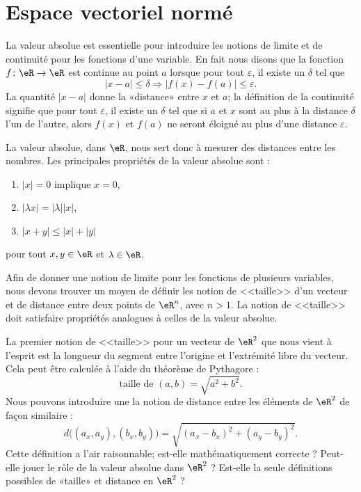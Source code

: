 
\section{Espace vectoriel normé}

La valeur absolue est essentielle pour introduire les notions de limite et de continuité pour les fonctions d'une variable. En fait nous disons que la fonction $f\colon \eR\to \eR$ est continue au point $a$ lorsque pour tout $\varepsilon$, il existe un $\delta$ tel que
\begin{equation}
	| x-a |\leq\delta \Rightarrow | f(x)-f(a) |\leq \varepsilon.
\end{equation}
La quantité $| x-a |$ donne la «distance» entre $x$ et $a$; la définition de la continuité signifie que pour tout $\varepsilon$, il existe un $\delta$ tel que si $a$ et $x$ sont au plus à la distance $\delta$ l'un de l'autre, alors $f(x)$ et $f(a)$ ne seront éloigné au plus d'une distance $\varepsilon$.

La valeur absolue, dans $\eR$, nous sert donc à mesurer des distances entre les nombres. Les principales propriétés de la valeur absolue sont :
\begin{enumerate}

	\item
		$| x |=0$ implique $x=0$,
	\item
		$| \lambda x |=| \lambda | |x |$,
	\item
		$| x+y |\leq | x |+| y |$

\end{enumerate}
pour tout $x,y\in\eR$ et $\lambda\in\eR$.

Afin de donner une notion de limite pour les fonctions de plusieurs variables, nous devons trouver un moyen de définir les notion de <<taille>> d'un vecteur et de distance entre deux points de $\eR^n$, avec $n>1$. La notion de <<taille>> doit satisfaire propriétés analogues à celles de la valeur absolue. 

La premier notion de <<taille>> pour un vecteur de $\eR^2$ que nous vient à l'esprit est la longueur du segment entre l'origine et l'extrémité libre du vecteur. Cela peut être calculée à l'aide du théorème de Pythagore : 
\begin{equation}
  \textrm{taille de } (a,b) = \sqrt{a^2+b^2}.
\end{equation}
Nous pouvons introduire une la notion de distance entre les éléments de $\eR^2$ de façon similaire :
\begin{equation}
	d\big((a_x,a_y),(b_x,b_y)\big)=\sqrt{  (a_x-b_x)^2+(a_y-b_y)^2  }.
\end{equation}
Cette définition a l'air raisonnable; est-elle mathématiquement correcte ? Peut-elle jouer le rôle de la valeur absolue dans $\eR^2$ ? Est-elle la seule définitions possibles de «taille» et distance en $\eR^2$ ?  


